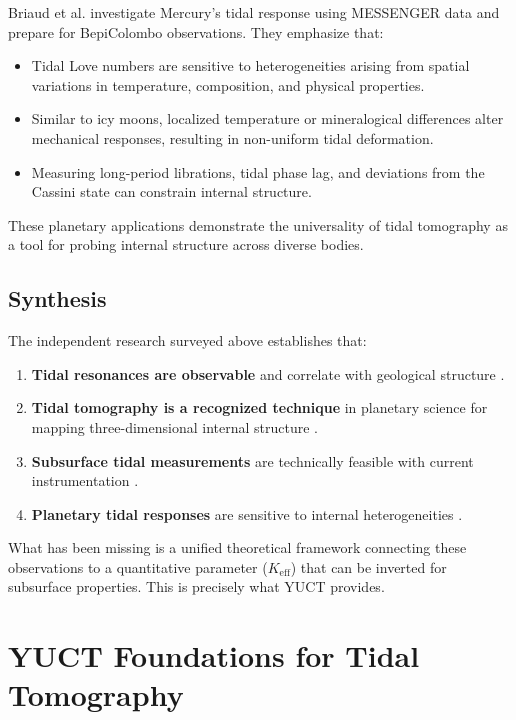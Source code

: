 \documentclass[12pt,a4paper]{article}
\theoremstyle{remark}
\newcommand{\Keff}{K_{\mathrm{eff}}}
\begin{document}
	Briaud et al. \cite{Briaud2025} investigate Mercury's tidal response using MESSENGER data and prepare for BepiColombo observations. They emphasize that:
	
	\begin{itemize}
		\item Tidal Love numbers are sensitive to heterogeneities arising from spatial variations in temperature, composition, and physical properties.
		\item Similar to icy moons, localized temperature or mineralogical differences alter mechanical responses, resulting in non-uniform tidal deformation.
		\item Measuring long-period librations, tidal phase lag, and deviations from the Cassini state can constrain internal structure.
	\end{itemize}
	
	These planetary applications demonstrate the universality of tidal tomography as a tool for probing internal structure across diverse bodies.
	
	\subsection{Synthesis}
	
	The independent research surveyed above establishes that:
	
	\begin{enumerate}
		\item \textbf{Tidal resonances are observable} and correlate with geological structure \cite{Sibgatulin2014}.
		\item \textbf{Tidal tomography is a recognized technique} in planetary science for mapping three-dimensional internal structure \cite{RoviraNavarro2025}.
		\item \textbf{Subsurface tidal measurements} are technically feasible with current instrumentation \cite{Rogister2024}.
		\item \textbf{Planetary tidal responses} are sensitive to internal heterogeneities \cite{Briaud2025}.
	\end{enumerate}
	
	What has been missing is a unified theoretical framework connecting these observations to a quantitative parameter ($\Keff$) that can be inverted for subsurface properties. This is precisely what YUCT provides.
	
	\section{YUCT Foundations for Tidal Tomography}
	\label{sec:yuct-foundations}
	
\end{document}
